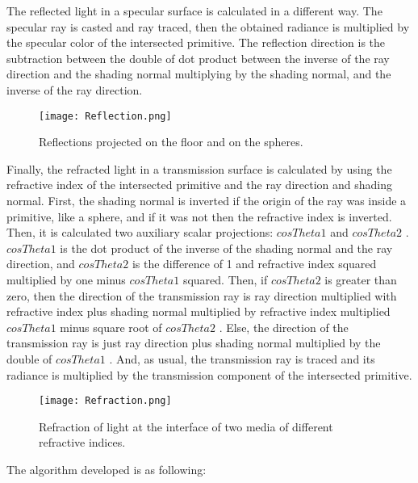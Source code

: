 \par
The reflected light in a specular surface is calculated in a different way.
The specular ray is casted and ray traced, then the obtained radiance is multiplied by the specular color of the intersected primitive.
The reflection direction is the subtraction between the double of dot product between the inverse of the ray direction and the shading normal multiplying by the shading normal, and the inverse of the ray direction.

\begin{figure}[H]
	\centering
	\caption{Reflections projected on the floor and on the spheres.}
	\label{Reflection.}
	\texttt{[image: Reflection.png]}
\end{figure}

\par
Finally, the refracted light in a transmission surface is calculated by using the refractive index of the intersected primitive and the ray direction and shading normal.
First, the shading normal is inverted if the origin of the ray was inside a primitive, like a sphere, and if it was not then the refractive index is inverted.
Then, it is calculated two auxiliary scalar projections:
$cosTheta1$
and
$cosTheta2$
.
$cosTheta1$
is the dot product of the inverse of the shading normal and the ray direction, and
$cosTheta2$
is the difference of 1 and refractive index squared multiplied by one minus
$cosTheta1$
squared.
Then, if
$cosTheta2$
is greater than zero, then the direction of the transmission ray is ray direction multiplied with refractive index plus shading normal multiplied by refractive index multiplied $cosTheta1$
minus square root of 
$cosTheta2$
.
Else, the direction of the transmission ray is just ray direction plus shading normal multiplied by the double of
$cosTheta1$
.
And, as usual, the transmission ray is traced and its radiance is multiplied by the transmission component of the intersected primitive.

\begin{figure}[H]
	\centering
	\caption{Refraction of light at the interface of two media of different refractive indices.}
	\label{Refraction.}
	\texttt{[image: Refraction.png]}
\end{figure}

\par
The algorithm developed is as following:

